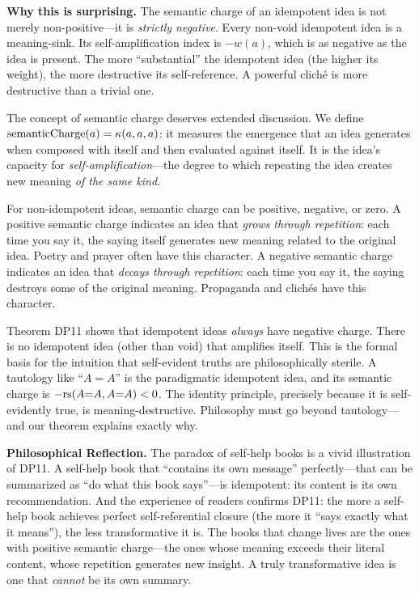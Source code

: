 \begin{surprisebox}
\textbf{Why this is surprising.} The semantic charge of an idempotent
idea is not merely non-positive---it is \emph{strictly negative}. Every
non-void idempotent idea is a meaning-sink. Its self-amplification index
is $-w(a)$, which is as negative as the idea is present. The more
``substantial'' the idempotent idea (the higher its weight), the more
destructive its self-reference. A powerful clich\'e is more destructive
than a trivial one.
\end{surprisebox}

The concept of semantic charge deserves extended discussion. We define
$\mathrm{semanticCharge}(a) = \kappa(a, a, a)$: it measures the
emergence that an idea generates when composed with itself and then
evaluated against itself. It is the idea's capacity for
\emph{self-amplification}---the degree to which repeating the idea
creates new meaning \emph{of the same kind}.

For non-idempotent ideas, semantic charge can be positive, negative, or
zero. A positive semantic charge indicates an idea that
\emph{grows through repetition}: each time you say it, the saying itself
generates new meaning related to the original idea. Poetry and prayer
often have this character. A negative semantic charge indicates an idea
that \emph{decays through repetition}: each time you say it, the saying
destroys some of the original meaning. Propaganda and clich\'es have this
character.

Theorem DP11 shows that idempotent ideas \emph{always} have negative
charge. There is no idempotent idea (other than void) that amplifies
itself. This is the formal basis for the intuition that self-evident
truths are philosophically sterile. A tautology like ``$A = A$'' is the
paradigmatic idempotent idea, and its semantic charge is
$-\mathrm{rs}(A{=}A, A{=}A) < 0$. The identity principle, precisely because it
is self-evidently true, is meaning-destructive. Philosophy must go
beyond tautology---and our theorem explains exactly why.

\begin{reflectionbox}
\textbf{Philosophical Reflection.}
The paradox of self-help books is a vivid illustration of DP11. A
self-help book that ``contains its own message'' perfectly---that can be
summarized as ``do what this book says''---is idempotent: its content is
its own recommendation. And the experience of readers confirms DP11: the
more a self-help book achieves perfect self-referential closure (the
more it ``says exactly what it means''), the less transformative it is.
The books that change lives are the ones with positive semantic
charge---the ones whose meaning exceeds their literal content, whose
repetition generates new insight. A truly transformative idea is one
that \emph{cannot} be its own summary.
\end{reflectionbox}

